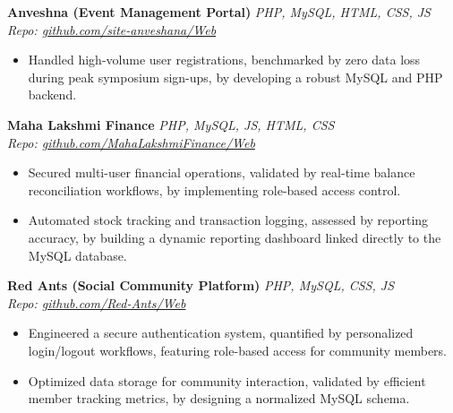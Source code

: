 \documentclass[10pt, letterpaper]{article}
\begin{document}
\vspace{2pt}

\noindent \textbf{Anveshna (Event Management Portal)} \hfill \textit{PHP, MySQL, HTML, CSS, JS} \\
\textit{Repo: \href{https://github.com/site-anveshana/Web}{github.com/site-anveshana/Web}}
\begin{itemize}
    \setlength{\itemsep}{1pt}
    \item Handled high-volume user registrations, benchmarked by zero data loss during peak symposium sign-ups, by developing a robust MySQL and PHP backend.
\end{itemize}

\vspace{2pt}

\noindent \textbf{Maha Lakshmi Finance} \hfill \textit{PHP, MySQL, JS, HTML, CSS} \\
\textit{Repo: \href{https://github.com/MahaLakshmiFinance/Web}{github.com/MahaLakshmiFinance/Web}}
\begin{itemize}
    \setlength{\itemsep}{1pt}
    \item Secured multi-user financial operations, validated by real-time balance reconciliation workflows, by implementing role-based access control.
    \item Automated stock tracking and transaction logging, assessed by reporting accuracy, by building a dynamic reporting dashboard linked directly to the MySQL database.
\end{itemize}

\vspace{2pt}

\noindent \textbf{Red Ants (Social Community Platform)} \hfill \textit{PHP, MySQL, CSS, JS} \\
\textit{Repo: \href{https://github.com/Red-Ants/Web}{github.com/Red-Ants/Web}}
\begin{itemize}
    \setlength{\itemsep}{1pt}
    \item Engineered a secure authentication system, quantified by personalized login/logout workflows, featuring role-based access for community members.
    \item Optimized data storage for community interaction, validated by efficient member tracking metrics, by designing a normalized MySQL schema.
\end{itemize}
\end{document}
